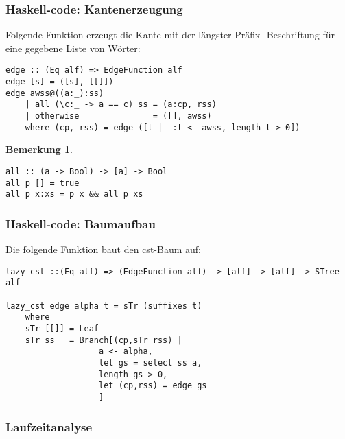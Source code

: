 \documentclass{beamer}
\newtheorem{remark}{Bemerkung}
\begin{document}
\begin{frame}[fragile]
\frametitle{Haskell-code: Kantenerzeugung}
Folgende Funktion erzeugt die Kante mit der längster-Präfix- Beschriftung für eine gegebene Liste von Wörter:
\begin{lstlisting}
edge :: (Eq alf) => EdgeFunction alf
edge [s] = ([s], [[]])
edge awss@((a:_):ss)
    | all (\c:_ -> a == c) ss = (a:cp, rss)
    | otherwise               = ([], awss)
    where (cp, rss) = edge ([t | _:t <- awss, length t > 0])
\end{lstlisting}
\bigskip
\begin{remark}
\begin{lstlisting}
all :: (a -> Bool) -> [a] -> Bool
all p [] = true
all p x:xs = p x && all p xs
\end{lstlisting}
\end{remark}
\end{frame}

\begin{frame}[fragile]
\frametitle{Haskell-code: Baumaufbau}
Die folgende Funktion baut den cst-Baum auf:
\begin{lstlisting}
lazy_cst ::(Eq alf) => (EdgeFunction alf) -> [alf] -> [alf] -> STree alf

lazy_cst edge alpha t = sTr (suffixes t)
    where
    sTr [[]] = Leaf
    sTr ss   = Branch[(cp,sTr rss) |
                   a <- alpha,
                   let gs = select ss a,
                   length gs > 0,
                   let (cp,rss) = edge gs
                   ]
\end{lstlisting}
\end{frame}

\subsubsection{Laufzeitanalyse}
\end{document}
